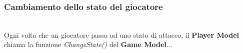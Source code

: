 \documentclass[a4paper,11pt]{article}
\begin{document}
\subsubsection{Cambiamento dello stato del giocatore}
\noindent{}\\Ogni volta che un giocatore passa ad uno stato di attacco, il \textbf{Player Model} chiama la funzione \emph{ChangeState()} del \textbf{Game Model}...
\end{document}
